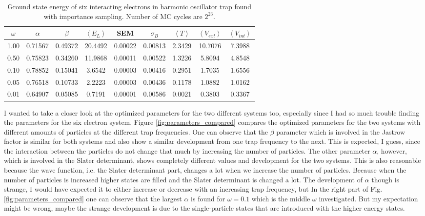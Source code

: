 \begin{table}[H]\caption{Ground state energy of six interacting electrons in harmonic oscillator trap found with importance sampling. Number of MC cycles are $2^{23}$.}\label{tab:ground_state_energy_importance_interaction_6p}
\center
\begin{tabular}{c|cccccccc}
$\omega$ & $\alpha$ & $\beta$ & $\left< E_L \right>$ & SEM & $\sigma_B$ &  $\left< T \right>$  & $\left< V_{ext}\right>$ & $\left<V_{int} \right>$  \\ \hline
1.00 & 0.71567 & 0.49372 & 20.4492 & 0.00022 & 0.00813 & 2.3429 & 10.7076 & 7.3988\\
0.50 & 0.75823 & 0.34260 & 11.9868 & 0.00011 & 0.00522 & 1.3226 & 5.8094 & 4.8548\\
0.10 & 0.78852 & 0.15041 & 3.6542 & 0.00003 & 0.00416 & 0.2951 & 1.7035 & 1.6556\\
0.05 & 0.76518 & 0.10733 & 2.2223 & 0.00003 & 0.00436 &  0.1178 & 1.0882 & 1.0162\\
0.01 & 0.64907 & 0.05085 & 0.7191 & 0.00001 & 0.00586 & 0.0021 & 0.3803 & 0.3367\\
\end{tabular}
\end{table}

I wanted to take a closer look at the optimized parameters for the two different systems too, especially since I had so much trouble finding the parameters for the six electron system. Figure \ref{fig:parameters_compared} compares the optimized parameters for the two systems with different amounts of particles at the different trap frequencies. One can observe that the $\beta$ parameter which is involved in the Jastrow factor is similar for both systems and also show a similar development from one trap frequency to the next. This is expected, I guess, since the interaction between the particles do not change that much by increasing the number of particles. The other parameter $\alpha$, however, which is involved in the Slater determinant, shows completely different values and development for the two systems. This is also reasonable because the wave function, i.e. the Slater determinant part, changes a lot when we increase the number of particles. Because when the number of particles is increased higher states are filled and the Slater determinant is changed a lot. The development of $\alpha$ though is strange, I would have expected it to either increase or decrease with an increasing trap frequency, but In the right part of Fig. \ref{fig:parameters_compared} one can observe that the largest $\alpha$ is found for $\omega = 0.1$ which is the middle $\omega$ investigated. But my expectation might be wrong, maybe the strange development is due to the single-particle states that are introduced with the higher energy states. 

